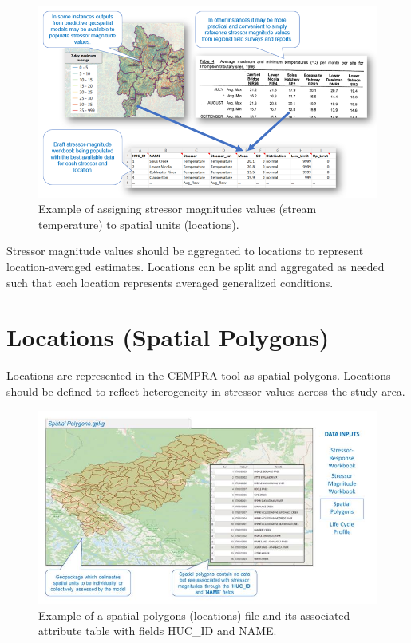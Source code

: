 \documentclass[
  letterpaper,
  DIV=11,
  numbers=noendperiod]{scrreprt}
\begin{document}
\begin{figure}

{\centering \includegraphics{images/image022.png}

}

\caption{\label{fig-stressor-magnitudes-values}Example of assigning
stressor magnitudes values (stream temperature) to spatial units
(locations).}

\end{figure}

Stressor magnitude values should be aggregated to locations to represent
location-averaged estimates. Locations can be split and aggregated as
needed such that each location represents averaged generalized
conditions.

\hypertarget{locations-spatial-polygons}{%
\section{Locations (Spatial
Polygons)}\label{locations-spatial-polygons}}

Locations are represented in the CEMPRA tool as spatial polygons.
Locations should be defined to reflect heterogeneity in stressor values
across the study area.

\begin{figure}

{\centering \includegraphics{images/image023.jpg}

}

\caption{\label{fig-spatial-polygons}Example of a spatial polygons
(locations) file and its associated attribute table with fields HUC\_ID
and NAME.}

\end{figure}
\end{document}

